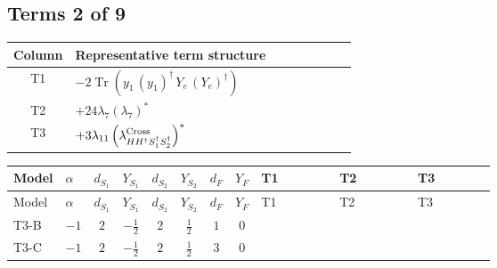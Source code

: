 \documentclass[8pt]{article}
\begin{document}
\begin{landscape}
\subsection*{Terms 2 of 9}
\begin{center}
\begin{tabular}{@{}c >{\raggedright\arraybackslash}p{0.82\linewidth}@{}}
\toprule
Column & Representative term structure \\
\midrule
T1 & \(\displaystyle -2 \operatorname{Tr}\!\left({y_1}\,\left({y_1}\right)^{\dagger}\,{Y_e}\,\left({Y_e}\right)^{\dagger}\right)\) \\
\midrule
T2 & \(\displaystyle +24 {\lambda_7} \left({\lambda_7}\right)^{*}\) \\
\midrule
T3 & \(\displaystyle +3 {\lambda_{11}} \left({\lambda_{H H^\dagger S_1^\dagger S_2^\dagger}^{\rm Cross}}\right)^{*}\) \\
\midrule
\bottomrule
\end{tabular}
\end{center}
\smallskip
\tiny
\begin{longtable}{@{}llcccccc >{\raggedright\arraybackslash}p{0.21\linewidth} >{\raggedright\arraybackslash}p{0.21\linewidth} >{\raggedright\arraybackslash}p{0.21\linewidth}@{}}
\toprule
Model & $\alpha$ & $d_{S_1}$ & $Y_{S_1}$ & $d_{S_2}$ & $Y_{S_2}$ & $d_F$ & $Y_F$ & T1 & T2 & T3 \\
\midrule
\endfirsthead
\toprule
Model & $\alpha$ & $d_{S_1}$ & $Y_{S_1}$ & $d_{S_2}$ & $Y_{S_2}$ & $d_F$ & $Y_F$ & T1 & T2 & T3 \\
\midrule
\endhead
T3-B & $-1$ & $2$ & $-\frac{1}{2}$ & $2$ & $\frac{1}{2}$ & $1$ & $0$ & \scriptsize\adjustbox{max width=\linewidth}{$\begin{gathered} -2 \operatorname{Tr}\!\left({y_1}\,\left({y_1}\right)^{\dagger}\,{Y_e}\,\left({Y_e}\right)^{\dagger}\right)\end{gathered}$} & \scriptsize\adjustbox{max width=\linewidth}{$\begin{gathered} +24 {\lambda_7} \left({\lambda_7}\right)^{*}\end{gathered}$} & \scriptsize\adjustbox{max width=\linewidth}{$\begin{gathered} +3 {\lambda_{11}} \left({\lambda_{H H^\dagger S_1^\dagger S_2^\dagger}^{\rm Cross}}\right)^{*}\end{gathered}$} \\
\midrule
T3-C & $-1$ & $2$ & $-\frac{1}{2}$ & $2$ & $\frac{1}{2}$ & $3$ & $0$ & \scriptsize\adjustbox{max width=\linewidth}{$\begin{gathered} -3 \operatorname{Tr}\!\left({y_1}\,\left({y_1}\right)^{\dagger}\,{Y_e}\,\left({Y_e}\right)^{\dagger}\right)\end{gathered}$} & \scriptsize\adjustbox{max width=\linewidth}{$\begin{gathered} +24 {\lambda_7} \left({\lambda_7}\right)^{*}\end{gathered}$} & \scriptsize\adjustbox{max width=\linewidth}{$\begin{gathered} +3 {\lambda_{11}} \left({\lambda_{H H^\dagger S_1^\dagger S_2^\dagger}^{\rm Cross}}\right)^{*}\end{gathered}$} \\

\end{longtable}
\end{landscape}
\end{document}
